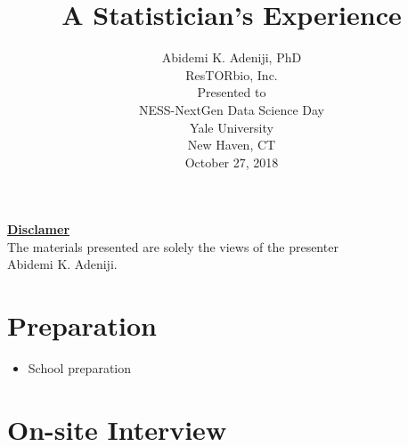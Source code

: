\documentclass{beamer}
\begin{document}
	\title{A Statistician’s Experience}
	\author{Abidemi K. Adeniji, PhD\\ResTORbio, Inc.\\
	\bigskip
	\bigskip
		Presented to\\
		NESS-NextGen Data Science Day\\
		Yale University\\
		New Haven, CT\\
		October 27, 2018}
		\date[]{}
\frame{\titlepage}
\begin{frame}
\centering\textbf{\underline{Disclamer}}\\
The materials presented are solely the views of the presenter\\
Abidemi K. Adeniji.
\end{frame}
\section{Preparation}
\begin{frame}

\begin{itemize}
\item School preparation
\end{itemize}
\end{frame}

\section{On-site Interview}
\end{document}
